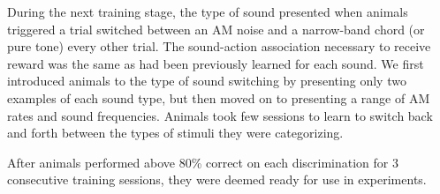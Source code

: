 During the next training stage, the type of sound presented when animals
triggered a trial switched between an AM noise and a narrow-band chord (or pure
tone) every other trial.
%
The sound-action association necessary to receive reward was the same as had
been previously learned for each sound.
%
We first introduced animals to the type of sound switching by presenting only
two examples of each sound type, but then moved on to presenting a range of AM
rates and sound frequencies.
%
Animals took few sessions to learn to switch back and forth between the types 
of stimuli they were categorizing.

After animals performed above 80\% correct on each discrimination for 3 consecutive training sessions, they were deemed ready for use in experiments. 

